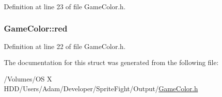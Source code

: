 Definition at line 23 of file Game\-Color.\-h.

\hypertarget{struct_game_color_a6eba511279980e3da2e8bc22839bd550}{
\subsubsection[{red}]{ Game\-Color\-::red}}\label{struct_game_color_a6eba511279980e3da2e8bc22839bd550}


Definition at line 22 of file Game\-Color.\-h.



The documentation for this struct was generated from the following file\-:\begin{DoxyCompactItemize}
\item 
/\-Volumes/\-O\-S X H\-D\-D/\-Users/\-Adam/\-Developer/\-Sprite\-Fight/\-Output/\hyperlink{_game_color_8h}{Game\-Color.\-h}\end{DoxyCompactItemize}

